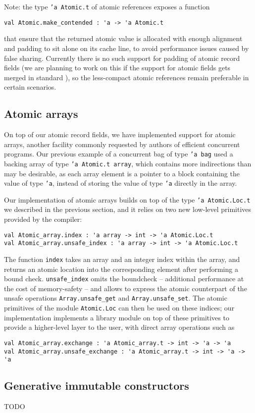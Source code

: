 Note: the type \texttt{'a Atomic.t} of atomic references exposes a function
\begin{verbatim}
val Atomic.make_contended : 'a -> 'a Atomic.t
\end{verbatim}
that ensure that the returned atomic value is allocated with enough
alignment and padding to sit alone on its cache line, to avoid
performance issues caused by false sharing. Currently there is no such
support for padding of atomic record fields (we are planning to
work on this if the support for atomic fields gets merged in
standard \OCaml), so the less-compact atomic references remain
preferable in certain scenarios.

\subsection{Atomic arrays} On top of our atomic record fields, we have
implemented support for atomic arrays, another facility commonly
requested by authors of efficient concurrent programs. Our previous
example of a concurrent bag of type \texttt{'a bag} used a backing
array of type \texttt{'a Atomic.t array}, which contains more
indirections than may be desirable, as each array element is a pointer
to a block containing the value of type \texttt{'a}, instead of
storing the value of type \texttt{'a} directly in the array.

Our implementation of atomic
arrays
builds on top of the type \texttt{'a Atomic.Loc.t} we
described in the previous section, and it relies on two new low-level
primitives provided by the compiler:
\begin{verbatim}
val Atomic_array.index : 'a array -> int -> 'a Atomic.Loc.t
val Atomic_array.unsafe_index : 'a array -> int -> 'a Atomic.Loc.t
\end{verbatim}

The function \texttt{index} takes an array and an integer index within the array, and returns an atomic location into the corresponding element after performing a bound check. \texttt{unsafe_index} omits the boundcheck -- additional performance at the cost of memory-safety -- and allows to express the atomic counterpart of the unsafe operations \texttt{Array.unsafe_get} and \texttt{Array.unsafe_set}. The atomic primitives of the module \texttt{Atomic.Loc} can then be used on these indices; our implementation implements a library module on top of these primitives to provide a higher-level layer to the user, with direct array operations such as
\begin{verbatim}
val Atomic_array.exchange : 'a Atomic_array.t -> int -> 'a -> 'a
val Atomic_array.unsafe_exchange : 'a Atomic_array.t -> int -> 'a -> 'a
\end{verbatim}

\subsection{Generative immutable constructors}

TODO
